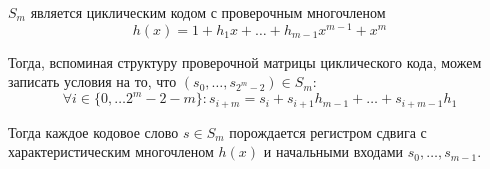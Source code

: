 \begin{remark}
$S_m$ является циклическим кодом с проверочным многочленом 
$$h(x) = 1 + h_1 x + \ldots + h_{m-1} x^{m-1} + x^m$$

Тогда, вспоминая структуру проверочной матрицы циклического кода,
можем записать условия на то, что $(s_0, \ldots, s_{2^m - 2}) \in S_m$:
$$\forall i \in \{0, \ldots 2^m-2-m\} \colon
  s_{i+m} = s_i + s_{i+1} h_{m-1} + \ldots + s_{i+m-1} h_1$$
\end{remark}

Тогда каждое кодовое слово $s \in S_m$ порождается регистром сдвига с характеристическим
многочленом $h(x)$ и начальными входами $s_0, \ldots, s_{m-1}$.


